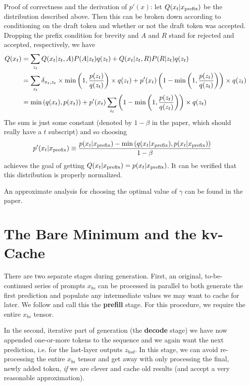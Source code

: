 Proof of correctness and the derivation of $ p'(x) $: let $ Q(x_t| x _{ {\rm  prefix}  }) $ be
the distribution described above. Then this can be broken down according to conditioning on the
draft token and whether or not the draft token was accepted. Dropping the prefix condition for
brevity and $ A $ and $ R $ stand for rejected and accepted, respectively, we have
\begin{align}
    Q(x_t) &=\sum _{ z _{ t } } Q(x_t|z _{ t } , A)P(A|z _{ t }) q(z _{ t }) + Q(x_t|z _{ t } , R)P(R|z _{ t }) q(z _{ t }) \nonumber\\
         &=\sum _{ z _{ t } } \delta  _{ x _{ t }, z _{  t } } \times\min \left (1, \frac{ p(z _{ t }) }{ q( z _{ t })
         }\right ) \times q (z _{  t })  + p'(x _{ t })\left (1 - \min \left (1, \frac{ p(z _{ t }) }{ q( z _{ t })
         }\right )  \right) \times q(z _{ t }) \nonumber\\
         &= \min \left (q(x _{ t }),  p(x _{ t })\right ) + p'(x _{ t })\sum _{ z _{ t } }\left (1 - \min \left (1, \frac{ p(z _{ t }) }{ q( z _{ t })
         }\right )  \right) \times q(z _{ t })
\end{align}
The sum is just some constant (denoted by $ 1 - \beta  $ in the paper, which should really have a $
t $ subscript) and so choosing
\begin{align}
    p'(x _{ t }| x_{\rm prefix}) &\equiv \frac{ p(x _{ t }| x_{\rm prefix}) - \min \left ( q(x _{ t }| x_{\rm prefix}), p(x _{ t }| x_{\rm prefix}) \right ) }{ 1- \beta }
\end{align}
achieves the goal of getting $Q(x _{ t }| x_{\rm prefix}) = p(x _{ t }| x_{\rm prefix}) $. It can be
verified that this distribution is properly normalized.

An approximate analysis for choosing the optimal value of $ \gamma  $ can be found in the paper.


\section{The Bare Minimum and the kv-Cache \label{sec_kv_cache}}


There are two separate stages during generation. First, an original, to-be-continued series of prompts
$ x _{ bs }  $ can be processed in parallel to both generate the first prediction and populate any
intermediate values we may want to cache for later. We follow \cite{pope2022efficiently} and call this the
\textbf{prefill} stage. For this procedure, we require the entire $ x _{ bs } $ tensor.

In the second, iterative part of generation (the \textbf{decode} stage) we have now appended
one-or-more tokens to the sequence and we again want the next prediction, i.e. 
for the last-layer outputs $ z _{ bsd } $. In this stage, we can avoid re-processing the entire $ x
		_{ bs } $ tensor and get away with only processing the final, newly added token, \textit{if} we are
clever and cache old results (and accept a very reasonable approximation).

